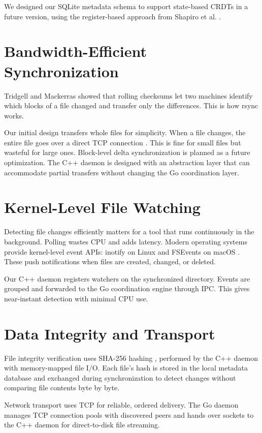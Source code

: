 We designed our SQLite metadata schema to support state-based CRDTs in a future version, using the register-based approach from Shapiro et al. \citeyear{shapiro2011}.

\section{Bandwidth-Efficient Synchronization}

Tridgell and Mackerras \citeyear{rsync1996} showed that rolling checksums let two machines identify which blocks of a file changed and transfer only the differences. This is how rsync works.

Our initial design transfers whole files for simplicity. When a file changes, the entire file goes over a direct TCP connection \cite{rfc9293}. This is fine for small files but wasteful for large ones. Block-level delta synchronization is planned as a future optimization. The C++ daemon is designed with an abstraction layer that can accommodate partial transfers without changing the Go coordination layer.

\section{Kernel-Level File Watching}

Detecting file changes efficiently matters for a tool that runs continuously in the background. Polling wastes CPU and adds latency. Modern operating systems provide kernel-level event APIs: inotify on Linux \cite{inotify7} and FSEvents on macOS \cite{fsevents}. These push notifications when files are created, changed, or deleted.

Our C++ daemon registers watchers on the synchronized directory. Events are grouped and forwarded to the Go coordination engine through IPC. This gives near-instant detection with minimal CPU use.

\section{Data Integrity and Transport}

File integrity verification uses SHA-256 hashing \cite{fips1804}, performed by the C++ daemon with memory-mapped file I/O. Each file's hash is stored in the local metadata database and exchanged during synchronization to detect changes without comparing file contents byte by byte.

Network transport uses TCP \cite{rfc9293} for reliable, ordered delivery. The Go daemon manages TCP connection pools with discovered peers and hands over sockets to the C++ daemon for direct-to-disk file streaming.

